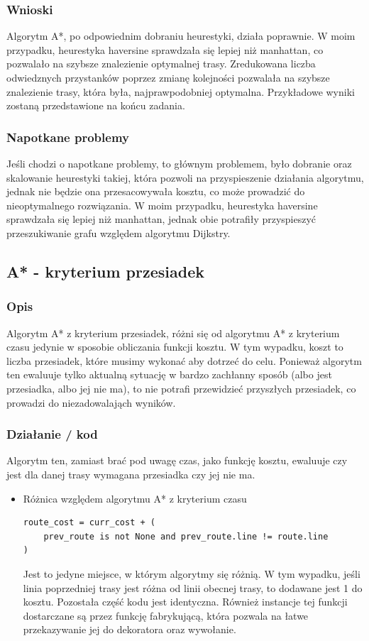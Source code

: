 \documentclass[a4paper, 12pt]{article}
\begin{document}
  \subsubsection{Wnioski}
  Algorytm A*, po odpowiednim dobraniu heurestyki, działa poprawnie.
  W moim przypadku, heurestyka haversine sprawdzała się lepiej niż manhattan, co pozwalało na szybsze
  znalezienie optymalnej trasy. Zredukowana liczba odwiedznych przystanków poprzez
  zmianę kolejności pozwalała na szybsze znalezienie trasy, która była, najprawpodobniej optymalna.
  Przykładowe wyniki zostaną przedstawione na końcu zadania.

  \subsubsection{Napotkane problemy}
  Jeśli chodzi o napotkane problemy, to głównym problemem, było dobranie 
  oraz skalowanie heurestyki takiej,
  która pozwoli na przyspieszenie działania algorytmu, jednak nie będzie ona przesacowywała
  kosztu, co może prowadzić do nieoptymalnego rozwiązania. W moim przypadku, heurestyka haversine
  sprawdzała się lepiej niż manhattan, jednak obie potrafiły przyspieszyć przeszukiwanie grafu 
  względem algorytmu Dijkstry.


  \subsection{A* - kryterium przesiadek}

  \subsubsection{Opis}
  Algorytm A* z kryterium przesiadek, różni się od algorytmu A* z kryterium czasu jedynie w sposobie
  obliczania funkcji kosztu. W tym wypadku, koszt to liczba przesiadek, które musimy wykonać
  aby dotrzeć do celu. Ponieważ algorytm ten ewaluuje tylko aktualną sytuację 
  w bardzo zachłanny sposób (albo jest przesiadka, albo jej nie ma), to 
  nie potrafi przewidzieć przyszłych przesiadek, co prowadzi do niezadowalająch wyników.

  \subsubsection{Działanie / kod}
  Algorytm ten, zamiast brać pod uwagę czas, jako funkcję kosztu, ewaluuje 
  czy jest dla danej trasy wymagana przesiadka czy jej nie ma.
  \begin{itemize}
    \item Różnica względem algorytmu A* z kryterium czasu
\begin{lstlisting}
route_cost = curr_cost + (
    prev_route is not None and prev_route.line != route.line
)
\end{lstlisting}
  Jest to jedyne miejsce, w którym algorytmy się różnią. W tym wypadku, jeśli linia
  poprzedniej trasy jest różna od linii obecnej trasy, to dodawane jest 1 do kosztu.
  Pozostała część kodu jest identyczna. Również instancje tej funkcji dostarczane są przez 
  funkcję fabrykującą, która pozwala na łatwe przekazywanie jej do dekoratora oraz wywołanie.
  \end{itemize}
\end{document}
